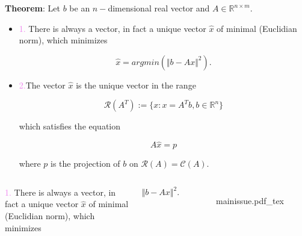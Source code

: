 \documentclass[aspectratio=169]{beamer}
\newcommand{\incfig}[2][1]{%
    \def\svgwidth{#1\columnwidth}
    {#2.pdf_tex} }
\begin{document}
\begin{frame}{} %
	
{\color{violet} \textbf{Theorem}:} Let $b$ be an $n-$dimensional real vector and $A \in \mathbb{R}^{n \times m}$.\\
	
\begin{itemize}
	\item \textcolor{violet}{1.} There is always a vector, in fact a unique vector $\hat{x}$ of minimal (Euclidian norm), which minimizes

		\[\hat x = argmin \left( \Vert b - A x \Vert^2 \right) . \]
	
	\item \textcolor{violet}{2.}The vector $\hat{x}$ is the unique vector in the range
		
	\[ \mathcal{R}(A^T) := \{ x : x = A^T b, b\in \mathbb{R}^n  \} \]
	
	\noindent which satisfies the equation
	
	\[ A \hat{x} = p \]
	
	\noindent where $p$ is the projection of $b$ on $\mathcal{R}(A) = \mathcal{C}(A).$

	\end{itemize}
\end{frame}

\begin{frame} %
	\begin{columns}
	

		\textcolor{violet}{1.} There is always a vector, in fact a unique vector $\hat{x}$ of minimal (Euclidian norm), which minimizes

		\[ \Vert b - A x \Vert^2. \]
		

\begin{figure}[ht]
    \centering
    \incfig{mainissue}
    \label{fig:minhatx}
\end{figure}

	\end{columns}
\end{frame}
\end{document}
